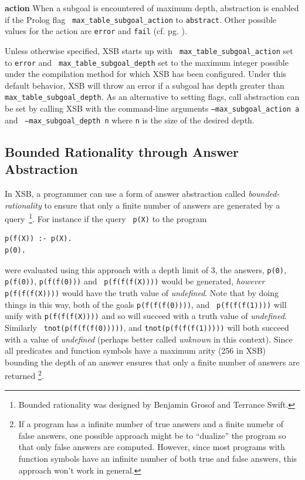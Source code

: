 \item {\bf action} When a subgoal is encountered of maximum depth,
  abstraction is enabled if the Prolog flag {\tt
    max\_table\_subgoal\_action} to {\tt abstract}.  Other possible
  values for the action are {\tt error} and {\tt fail} (cf. pg. \pageref{prolog-flags}).
\ei

\noindent
Unless otherwise specified, XSB starts up with {\tt
  max\_table\_subgoal\_action} set to {\tt error} and {\tt
  max\_table\_subgoal\_depth} set to the maximum integer possible
under the compilation method for which XSB has been configured.  Under
this default behavior, XSB will throw an error if a subgoal has depth
greater than {\tt max\_table\_subgoal\_depth}.  As an alternative to
setting flags, call abstraction can be set by calling XSB with the
command-line arguments {\tt --max\_subgoal\_action a} and {\tt
  --max\_subgoal\_depth n} where {\tt n} is the size of the desired
depth.

\subsection{Bounded Rationality through Answer Abstraction}
%
In XSB, a programmer can use a form of answer abstraction called {\em
  bounded-rationality} to ensure that only a finite number of answers
are generated by a query~\footnote{Bounded rationality was designed by
  Benjamin Grosof and Terrance Swift.}. For instance if the query {\tt
  p(X)} to the program
%
\begin{verbatim}
p(f(X)) :- p(X).  
p(0).
\end{verbatim}
%
were evaluated using this approach with a depth limit of 3, the
answers, {\tt p(0)}, {\tt p(f(0))}, {\tt p(f(f(0)))} and {\tt
  p(f(f(f(X))))} would be generated, {\em however} {\tt p(f(f(f(X))))}
would have the truth value of {\em undefined}.  Note that by doing
things in this way, both of the goals {\tt p(f(f(f(0))))}, and {\tt
  p(f(f(f(1))))} will unify with {\tt p(f(f(f(X))))} and so will
succeed with a truth value of {\em undefined}.  Similarly {\tt
  tnot(p(f(f(f(0)))))}, and {\tt tnot(p(f(f(f(1)))))} will both
succeed with a value of {\em undefined} (perhaps better called {\em
  unknown} in this context).
%
Since all predicates and function symbols have a maximum arity (256 in
XSB) bounding the depth of an answer ensures that only a finite number
of answers are returned
\footnote{If a program has a infinite number of true answers and a
  finite numebr of false answers, one possible approach might be to
  ``dualize'' the program so that only false answers are computed.
  However, since most programs with function symbols have an infinite
  number of both true and false answers, this approach won't work in
  general.}.


